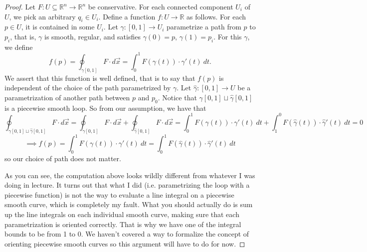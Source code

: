 \documentclass{article}
\theoremstyle{plain} %
\numberwithin{thm}{section} %
\theoremstyle{definition}
\begin{document}
    \begin{proof}
        Let \(F: U \subseteq \mathbb{R}^n \to \mathbb{R}^n\) be conservative. For each connected component \(U_i\) of \(U\), we pick an arbitrary \(q_i \in U_i\). Define a function \(f: U \to \mathbb{R}\) as follows. For each \(p \in U\), it is contained in some \(U_i\). Let \(\gamma : [0,1] \to U_i\) parametrize a path from \(p\) to \(p_i\), that is, \(\gamma\) is smooth, regular, and satisfies \(\gamma (0) = p\), \(\gamma (1) = p_i\). For this \(\gamma\), we define
        \[
            f(p) = \oint _{\gamma [0,1]} F \cdot d\vec{x} = \int _0^1 F (\gamma (t))\cdot \gamma '(t)\ dt.
        \]
        We assert that this function is well defined, that is to say that \(f(p)\) is independent of the choice of the path parametrized by \(\gamma\). Let \(\hat{\gamma}: [0,1] \to U\) be a parametrization of another path between \(p\) and \(p_0\). Notice that \(\gamma [0,1] \sqcup \hat{\gamma}[0,1]\) is a piecewise smooth loop. So from our assumption, we have that
        \[
            \oint _{\gamma [0,1] \sqcup \hat{\gamma}[0,1]} F \cdot d\vec{x} = \oint _{\gamma [0,1]} F \cdot d\vec{x} + \oint _{\hat{\gamma}[0,1]} F \cdot d\vec{x} = \int _0^1 F(\gamma (t))\cdot \gamma '(t)\ dt + \int _1^0 F(\hat{\gamma}(t))\cdot \hat{\gamma}'(t)\ dt = 0
        \]
        \[
            \implies f(p) = \int _0^1 F(\gamma (t))\cdot \gamma '(t)\ dt = \int _0^1 F(\hat{\gamma}(t))\cdot \hat{\gamma}'(t)\ dt
        \]
        so our choice of path does not matter.
        
        As you can see, the computation above looks wildly different from whatever I was doing in lecture. It turns out that what I did (i.e. parametrizing the loop with a piecewise function) is not the way to evaluate a line integral on a piecewise smooth curve, which is completely my fault. What you should actually do is sum up the line integrals on each individual smooth curve, making sure that each parametrization is oriented correctly. That is why we have one of the integral bounds to be from 1 to 0. We haven't covered a way to formalize the concept of orienting piecewise smooth curves so this argument will have to do for now.


\end{proof}
\end{document}
